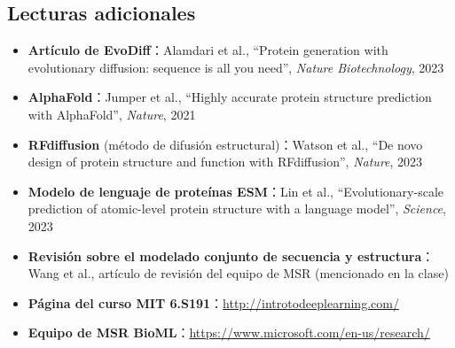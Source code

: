 \subsection{Lecturas adicionales}

\begin{itemize}
    \item \textbf{Artículo de EvoDiff}：Alamdari et al., ``Protein generation with evolutionary diffusion: sequence is all you need'', \textit{Nature Biotechnology}, 2023
    \item \textbf{AlphaFold}：Jumper et al., ``Highly accurate protein structure prediction with AlphaFold'', \textit{Nature}, 2021
    \item \textbf{RFdiffusion} (método de difusión estructural)：Watson et al., ``De novo design of protein structure and function with RFdiffusion'', \textit{Nature}, 2023
    \item \textbf{Modelo de lenguaje de proteínas ESM}：Lin et al., ``Evolutionary-scale prediction of atomic-level protein structure with a language model'', \textit{Science}, 2023
    \item \textbf{Revisión sobre el modelado conjunto de secuencia y estructura}：Wang et al., artículo de revisión del equipo de MSR (mencionado en la clase)
    \item \textbf{Página del curso MIT 6.S191}：\url{http://introtodeeplearning.com/}
    \item \textbf{Equipo de MSR BioML}：\url{https://www.microsoft.com/en-us/research/}
\end{itemize}



